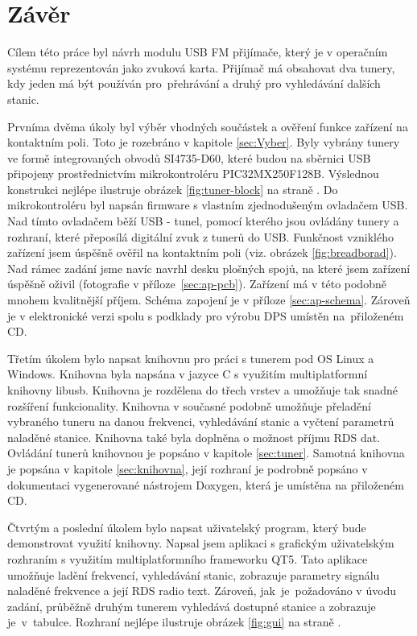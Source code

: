 \section{Závěr}
\label{sec:Conclusion}


Cílem této práce byl návrh modulu USB FM přijímače, který je v operačním systému reprezentován jako zvuková karta. Přijímač má obsahovat dva tunery, kdy jeden má být používán pro~přehrávání a druhý pro vyhledávání dalších stanic. 

Prvníma dvěma úkoly byl výběr vhodných součástek a ověření funkce zařízení na kontaktním poli. Toto je rozebráno v kapitole \ref{sec:Vyber}. Byly vybrány tunery ve formě integrovaných obvodů SI4735-D60, které budou na sběrnici USB připojeny prostřednictvím mikrokontroléru PIC32MX250F128B. Výslednou konstrukci nejlépe ilustruje obrázek \ref{fig:tuner-block} na straně \pageref{fig:tuner-block}. Do mikrokontroléru byl napsán firmware s vlastním zjednodušeným ovladačem USB. Nad tímto ovladačem běží USB - \iic tunel, pomocí kterého jsou ovládány tunery a rozhraní, které přeposílá digitální zvuk z tunerů do USB. Funkčnost vzniklého zařízení jsem úspěšně ověřil na kontaktním poli (viz. obrázek \ref{fig:breadborad}). Nad rámec zadání jsme navíc navrhl  desku plošných spojů, na které jsem zařízení úspěšně oživil (fotografie v příloze~\ref{sec:ap-pcb}). Zařízení má v této podobně mnohem kvalitnější příjem. Schéma zapojení je v příloze \ref{sec:ap-schema}. Zároveň je v elektronické verzi spolu s podklady pro výrobu DPS umístěn na~přiloženém CD.

Třetím úkolem bylo napsat knihovnu pro práci s tunerem pod OS Linux a Windows. Knihovna byla napsána v jazyce C s využitím multiplatformní knihovny libusb. Knihovna je rozdělena do třech vrstev a umožňuje tak snadné rozšíření funkcionality. Knihovna v současné podobně umožňuje přeladění vybraného tuneru na danou frekvenci, vyhledávání stanic a vyčtení parametrů naladěné stanice. Knihovna také byla doplněna o možnost příjmu RDS dat. Ovládání tunerů knihovnou je popsáno v kapitole \ref{sec:tuner}. Samotná knihovna je popsána v kapitole \ref{sec:knihovna}, její rozhraní je podrobně popsáno v dokumentaci vygenerované nástrojem Doxygen, která je umístěna na přiloženém CD.

Čtvrtým a poslední úkolem bylo napsat uživatelský program, který bude demonstrovat využití knihovny. Napsal jsem aplikaci s grafickým uživatelským rozhraním s využitím multiplatformního frameworku QT5. Tato aplikace umožňuje ladění frekvencí, vyhledávání stanic, zobrazuje parametry signálu naladěné frekvence a její RDS radio text. Zároveň, jak~je~požadováno v úvodu zadání, průběžně druhým tunerem vyhledává dostupné stanice a zobrazuje je~v~tabulce. Rozhraní nejlépe ilustruje obrázek \ref{fig:gui} na straně \pageref{fig:gui}.

